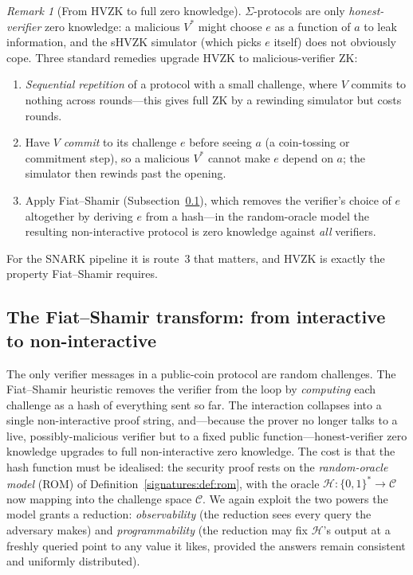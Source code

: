 \documentclass[11pt,a4paper]{article}
\theoremstyle{definition}
\theoremstyle{remark}
\newtheorem{remark}[theorem]{Remark}
\begin{document}
\begin{remark}[From HVZK to full zero knowledge]\label{zk:rem:hvzktozk}
\(\Sigma\)-protocols are only \emph{honest-verifier} zero knowledge: a malicious \(V^*\) might choose \(e\) as a function of \(a\) to leak information, and the sHVZK simulator (which picks \(e\) itself) does not obviously cope. Three standard remedies upgrade HVZK to malicious-verifier ZK:
\begin{enumerate}
  \item \emph{Sequential repetition} of a protocol with a small challenge, where \(V\) commits to nothing across rounds---this gives full ZK by a rewinding simulator but costs rounds.
  \item Have \(V\) \emph{commit} to its challenge \(e\) before seeing \(a\) (a coin-tossing or commitment step), so a malicious \(V^*\) cannot make \(e\) depend on \(a\); the simulator then rewinds past the opening.
  \item Apply Fiat--Shamir (Subsection~\ref{zk:subsec:fiatshamir}), which removes the verifier's choice of \(e\) altogether by deriving \(e\) from a hash---in the random-oracle model the resulting non-interactive protocol is zero knowledge against \emph{all} verifiers.
\end{enumerate}
For the SNARK pipeline it is route~3 that matters, and HVZK is exactly the property Fiat--Shamir requires.
\end{remark}

\subsection{The Fiat--Shamir transform: from interactive to non-interactive}\label{zk:subsec:fiatshamir}

The only verifier messages in a public-coin protocol are random challenges. The Fiat--Shamir heuristic removes the verifier from the loop by \emph{computing} each challenge as a hash of everything sent so far. The interaction collapses into a single non-interactive proof string, and---because the prover no longer talks to a live, possibly-malicious verifier but to a fixed public function---honest-verifier zero knowledge upgrades to full non-interactive zero knowledge. The cost is that the hash function must be idealised: the security proof rests on the \emph{random-oracle model} (ROM) of Definition~\ref{signatures:def:rom}, with the oracle \(\mathcal{H} : \{0,1\}^* \to \mathcal{C}\) now mapping into the challenge space \(\mathcal{C}\). We again exploit the two powers the model grants a reduction: \emph{observability} (the reduction sees every query the adversary makes) and \emph{programmability} (the reduction may fix \(\mathcal{H}\)'s output at a freshly queried point to any value it likes, provided the answers remain consistent and uniformly distributed).
\end{document}
